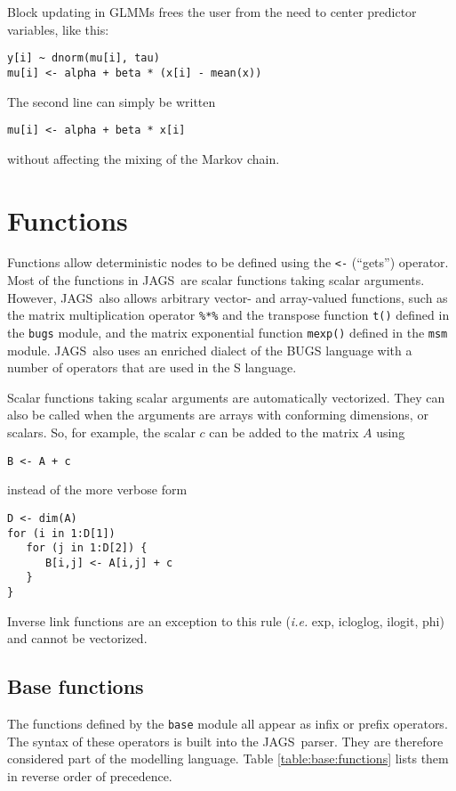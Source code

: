 \documentclass[11pt, a4paper, titlepage]{report}
\newcommand{\JAGS}{\textsf{JAGS}}
\begin{document}
Block updating in GLMMs frees the user from the need to center
predictor variables, like this:
\begin{verbatim}
y[i] ~ dnorm(mu[i], tau)
mu[i] <- alpha + beta * (x[i] - mean(x))
\end{verbatim}
The second line can simply be written
\begin{verbatim}
mu[i] <- alpha + beta * x[i]
\end{verbatim}
without affecting the mixing of the Markov chain.  

\chapter{Functions}
\label{section:functions}

Functions allow deterministic nodes to be defined using the \verb+<-+
(``gets'') operator.  Most of the functions in \JAGS\ are scalar
functions taking scalar arguments. However, \JAGS\ also allows
arbitrary vector- and array-valued functions, such as the matrix
multiplication operator \verb+%*%+ and the transpose function
\verb+t()+ defined in the \verb+bugs+ module, and the matrix
exponential function \verb+mexp()+ defined in the \verb+msm+
module. \JAGS\ also uses an enriched dialect of the BUGS language with
a number of operators that are used in the S language.

Scalar functions taking scalar arguments are automatically vectorized.
They can also be called when the arguments are arrays with conforming
dimensions, or scalars. So, for example, the scalar $c$ can be added to
the matrix $A$ using
\begin{verbatim}
B <- A + c
\end{verbatim}
instead of the more verbose form
\begin{verbatim}
D <- dim(A)
for (i in 1:D[1])
   for (j in 1:D[2]) {
      B[i,j] <- A[i,j] + c
   }
}
\end{verbatim}
Inverse link functions are an exception to this rule ({\em i.e.} exp,
icloglog, ilogit, phi) and cannot be vectorized. 

\section{Base functions}
\label{section:functions:base}

The functions defined by the \verb+base+ module all appear as infix or
prefix operators. The syntax of these operators is built into the
\JAGS\ parser. They are therefore considered part of the modelling
language.  Table \ref{table:base:functions} lists them in reverse
order of precedence.
\end{document}
